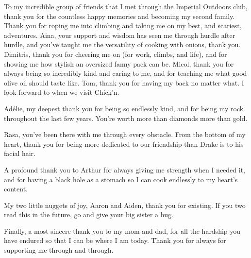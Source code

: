 \begin{acknowledgements}
    To my incredible group of friends that I met through the Imperial Outdoors club, thank you for the countless happy memories and becoming my second family. Thank you for roping me into climbing and taking me on my best, and scariest, adventures. Aina, your support and wisdom has seen me through hurdle after hurdle, and you've taught me the versatility of cooking with onions, thank you. Dimitris, thank you for cheering me on (for work, climbs, and life), and for showing me how stylish an oversized fanny pack can be. Micol, thank you for always being so incredibly kind and caring to me, and for teaching me what good olive oil should taste like. Tom, thank you for having my back no matter what. I look forward to when we visit Chick’n. 
    
    Adélie, my deepest thank you for being so endlessly kind, and for being my rock throughout the last few years. You’re worth more than diamonds more than gold. 
    
    Rasa, you’ve been there with me through every obstacle. From the bottom of my heart, thank you for being more dedicated to our friendship than Drake is to his facial hair. 
    
    A profound thank you to Arthur for always giving me strength when I needed it, and for having a black hole as a stomach so I can cook endlessly to my heart’s content. 
    
    My two little nuggets of joy, Aaron and Aiden, thank you for existing. If you two read this in the future, go and give your big sister a hug.
    
    Finally, a most sincere thank you to my mom and dad, for all the hardship you have endured so that I can be where I am today. Thank you for always for supporting me through and through. 
\end{acknowledgements}

\tableofcontents

